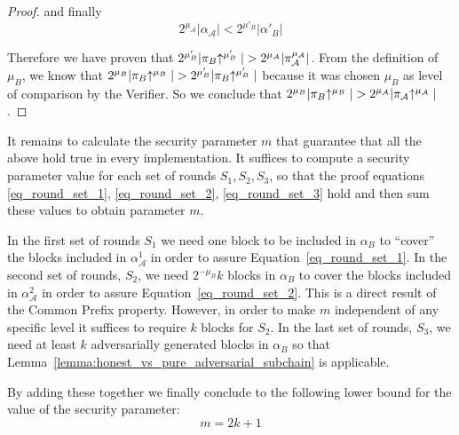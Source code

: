\begin{proof}
	and finally
	\begin{equation}
	2^{\mu_\mathcal{A}} \vert \alpha_\mathcal{A} \vert < 2^{\mu'_B} \vert \alpha'{_B} \vert
	\end{equation}


	Therefore we have proven that $2^{\mu'_B} \vert \pi_B \negthickspace\uparrow^{\mu'_B} \vert >
	2^{\mu_\mathcal{A}} \vert \pi_\mathcal{A}^{\mu_\mathcal{A}} \vert$. From the definition of $\mu_B$, we know
	that $2^{\mu_B} \vert \pi_B \negthickspace\uparrow^{\mu_B} \vert > 2^{\mu'_B} \vert \pi_B
	\negthickspace\uparrow^{\mu'_B} \vert$ because it was chosen $\mu_B$ as level of comparison
	by the Verifier. So we conclude that $2^{\mu_B} \vert \pi_B \negthickspace\uparrow^{\mu_B}
	\vert > 2^{\mu_\mathcal{A}} \vert \pi_\mathcal{A} \negthickspace\uparrow^{\mu_\mathcal{A}} \vert$.

\end{proof}

It remains to calculate the security parameter $m$ that guarantee that all the above
hold true in every implementation. It suffices to compute a security parameter
value for each set of rounds $S_1, S_2, S_3$, so that the proof equations
\ref{eq_round_set_1}, \ref{eq_round_set_2}, \ref{eq_round_set_3} hold and
then sum these values to obtain parameter $m$.

In the first set of rounds $S_1$ we need
one block to be included in $\alpha_B$ to ``cover'' the blocks included in $\alpha^1_\mathcal{A}$ in order to assure Equation~\ref{eq_round_set_1}. In the second set of rounds, $S_2$, we need $2^{-\mu_B} k$ blocks in $\alpha_B$ to cover the blocks included in $\alpha^2_\mathcal{A}$ in order to assure Equation~\ref{eq_round_set_2}. This is a direct result of the Common Prefix property. However, in order to make $m$ independent
of any specific level it suffices to require $k$ blocks
for $S_2$. In the last set of rounds, $S_3$, we need at least $k$
adversarially generated blocks in $\alpha_B$ so that Lemma~\ref{lemma:honest_vs_pure_adversarial_subchain} is applicable.

By adding these together we finally conclude to the following lower bound for the value of the
security parameter:
\begin{equation}
	m = 2k + 1
\end{equation}